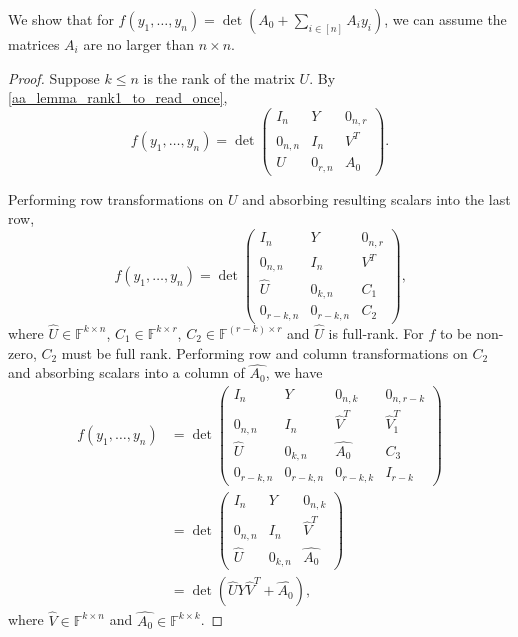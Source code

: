 \documentclass[11pt,letterpaper]{article}
\newcommand{\F}{\mathbb{F}}
\newtheorem{lemma}{Lemma}[section]
\begin{document}
{{{We show that for $f(y_1,\dots, y_n) = \det(A_0 + \sum_{i \in [n]} A_i y_i)$, we can assume the matrices $A_i$ are no larger than $n \times n$.

\begin{proof}
Suppose $k \leq n$ is the rank of the matrix $U$. By \cref{aa_lemma_rank1_to_read_once},
\[
    f(y_1, \dots, y_n) = \det \begin{pmatrix}
        I_n & Y & 0_{n,r} \\
        0_{n,n} & I_n & V^T \\
        U & 0_{r,n} & A_0
    \end{pmatrix}\text{.}
\]

Performing row transformations on $U$ and absorbing resulting scalars into the last row,
\[
    f(y_1, \dots, y_n) = \det \begin{pmatrix}
        I_n & Y & 0_{n,r} \\
        0_{n,n} & I_n & V^T \\
        \hat{U} & 0_{k,n} & C_1 \\
        0_{r-k, n} & 0_{r-k, n} & C_2
    \end{pmatrix}\text{,}
\]
where $\hat{U} \in \F^{k \times n}$, $C_1 \in \F^{k \times r}$, $C_2 \in \F^{(r-k) \times r}$ and $\hat{U}$ is full-rank. For $f$ to be non-zero, $C_2$ must be full rank. Performing row and column transformations on $C_2$ and absorbing scalars into a column of $\hat{A_0}$, we have
\begin{align*}
    f(y_1, \dots, y_n) &= \det \begin{pmatrix}
        I_n & Y & 0_{n,k} & 0_{n,r-k} \\
        0_{n,n} & I_n & \hat{V}^T & \hat{V}_1^T \\
        \hat{U} & 0_{k,n} & \hat{A_0} & C_3 \\
        0_{r-k, n} & 0_{r-k, n} & 0_{r-k, k} & I_{r-k}
    \end{pmatrix} \\
    &= \det \begin{pmatrix}
        I_n & Y & 0_{n,k} \\
        0_{n,n} & I_n & \hat{V}^T \\
        \hat{U} & 0_{k,n} & \hat{A_0}
    \end{pmatrix} \\
    &= \det(\hat{U}Y\hat{V}^T + \hat{A_0})\text{,}
\end{align*}
where $\hat{V} \in \F^{k \times n}$ and $\hat{A_0} \in \F^{k \times k}$.
\end{proof}

}}}
\end{document}
